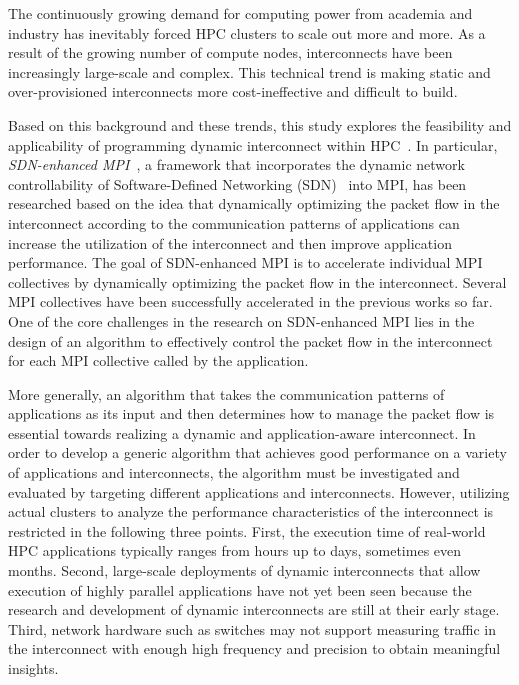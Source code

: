 The continuously growing demand for computing power from academia and
industry has inevitably forced HPC clusters to scale out more and more.
As a result of the growing number of compute nodes, interconnects
have been increasingly large-scale and complex. This technical trend is making
static and over-provisioned interconnects more cost-ineffective and
difficult to build.

Based on this background and these trends, this study explores the feasibility
and applicability of programming dynamic interconnect within
HPC~\autocite{Date2016}. In particular, \emph{SDN-enhanced
MPI}~\autocite{Takahashi2014,Dashdavaa2013}, a framework that incorporates
the dynamic network controllability of Software-Defined Networking
(SDN)~\autocite{sdn} into MPI, has been researched based on the idea that
dynamically optimizing the packet flow in the interconnect according to the
communication patterns of applications can increase the utilization of the
interconnect and then improve application performance. The goal of
SDN-enhanced MPI is to accelerate individual MPI collectives by dynamically
optimizing the packet flow in the interconnect. Several MPI collectives have
been successfully accelerated in the previous works so far. One of the core
challenges in the research on SDN-enhanced MPI lies in the design of an
algorithm to effectively control the packet flow in the interconnect for each
MPI collective called by the application.

More generally, an algorithm that takes the communication patterns of
applications as its input and then determines how to manage the packet flow
is essential towards realizing a dynamic and application-aware interconnect.
In order to develop a generic algorithm that achieves good performance on a
variety of applications and interconnects, the algorithm must be investigated
and evaluated by targeting different applications and interconnects. However,
utilizing actual clusters to analyze the performance characteristics of the
interconnect is restricted in the following three points. First, the execution
time of real-world HPC applications typically ranges from hours up to days,
sometimes even months. Second, large-scale deployments of dynamic
interconnects that allow execution of highly parallel applications have not
yet been seen because the research and development of dynamic interconnects
are still at their early stage. Third, network hardware such as switches may
not support measuring traffic in the interconnect with enough high frequency
and precision to obtain meaningful insights.


